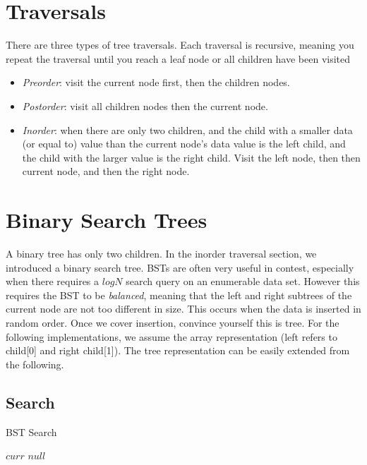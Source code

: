 \documentclass{article}
\begin{document}
\section{Traversals}
There are three types of tree traversals. Each traversal is recursive, meaning you repeat the traversal until you reach a leaf node or all children have been visited
\begin{itemize}
    \item \textit{Preorder}: visit the current node first, then the children nodes.
    \item \textit{Postorder}: visit all children nodes then the current node.
    \item \textit{Inorder}: when there are only two children, and the child with a smaller data (or equal to) value than the current node's data value is the left child, and the child with the larger value is the right child. Visit the left node, then then current node, and then the right node.

\end{itemize}

\section{Binary Search Trees}
A binary tree has only two children. In the inorder traversal section, we introduced a binary search tree. BSTs are often very useful in contest, especially when there requires a $logN$ search query on an enumerable data set. However this requires the BST to be \textit{balanced}, meaning that the left and right subtrees of the current node are not too different in size. This occurs when the data is inserted in random order. Once we cover insertion, convince yourself this is tree. For the following implementations, we assume the array representation (left refers to child[0] and right child[1]). The tree representation can be easily extended from the following.    

\subsection{Search}
\begin{algorithm}[H]
\caption{BST Search}
\begin{algorithmic}
		\State \Return $curr$
	\EndIf
	    \State \Return $null$
	\EndIf
        \State \Return {}
    \Else
    	\State \Return {}
    \EndIf
\EndFunction
\end{algorithmic}
\end{algorithm}
\end{document}
